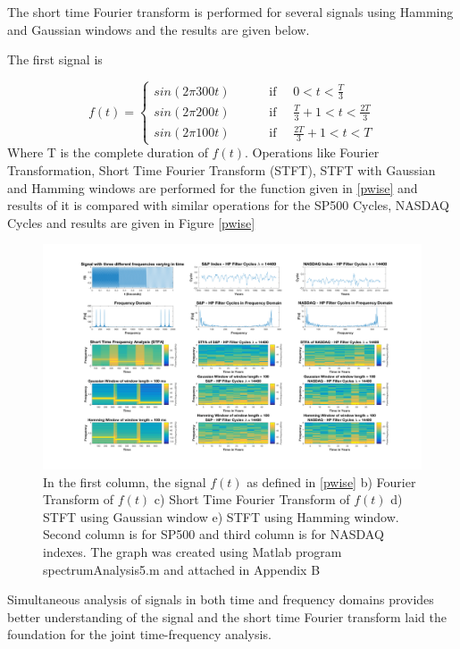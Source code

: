 The short time Fourier transform is performed for several signals using Hamming and Gaussian windows and the results are given below.

The first signal is

\begin{equation}\label{pwise}
f(t)  =
\left\{
\!
\begin{aligned}
sin(2\pi 300 t)  & \quad \quad \text{ if }\quad 0< t<\frac{T}{3}\\
sin(2\pi 200 t)  & \quad \quad \text{ if }\quad \frac{T}{3}+1<t<\frac{2T}{3}\\
sin(2\pi 100 t)  & \quad \quad \text{ if }\quad  \frac{2T}{3}+1<t<T
\end{aligned}
\right.
\end{equation}
Where T is the complete duration of $f(t)$. Operations like Fourier Transformation, Short Time Fourier Transform (STFT), STFT with Gaussian and Hamming windows are performed for the function given in \ref{pwise} and results of it is compared with similar operations for the SP500 Cycles, NASDAQ Cycles and results are given in Figure \ref{pwise}

\begin{figure}[!ht]
\includegraphics[scale=.16]{Images/Spectrum}
\caption{In the first column, the signal $f(t)$ as defined in \ref{pwise} b) Fourier Transform of $f(t)$ c) Short Time Fourier Transform of $f(t)$ d) STFT using Gaussian window e) STFT using Hamming window. Second column is for SP500 and third column is for NASDAQ indexes. The graph was created using Matlab program spectrumAnalysis5.m and attached in Appendix B }
\label{fig:spectrum}
\end{figure}


Simultaneous analysis of signals in both time and frequency domains provides better understanding of the signal and the short time Fourier transform laid the foundation for the joint time-frequency analysis.
